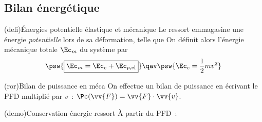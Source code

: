 \documentclass[../../main/main.tex]{subfiles}
\begin{document}
\subsection{Bilan énergétique}

\begin{tcb*}[label=def:emeca, sidebyside,
  list entry={\lte\thedefi~:~Énergies d'un ressort}]
  (defi){Énergies potentielle élastique et mécanique}
	Le ressort emmagasine une énergie \textit{potentielle} lors de sa
	déformation, telle que
	\psw{%
		\[
			\boxed{
				\Ec_{p\rm, el} = \frac{1}{2}k(\ell-\ell_0)^2 = \frac{1}{2}kx^2
			}%
		\]
	}%
	\tcblower
	On définit alors l'énergie mécanique totale $\Ec_m$ du système par
		\[
	\psw{%
			\boxed{\Ec_m = \Ec_c + \Ec_{p\rm, el}}
	}%
  \qav
  \psw{%
    \Ec_c = \frac{1}{2}mv^2
  }%
		\]
\end{tcb*}

\begin{tcb}[fontupper=\Large, bld, cnt](ror){Bilan de puissance en méca}
	On effectue un bilan de puissance en écrivant le PFD multiplié par $v$~:
	$\Pc(\vv{F}) = \vv{F}\cdot \vv{v}$.
\end{tcb}

\begin{tcb*}[label=demo:emecacons](demo){Conservation énergie ressort}
	À partir du PFD~:
	\vspace{-15pt}
	\vspace{-15pt}
\end{tcb*}
\end{document}
